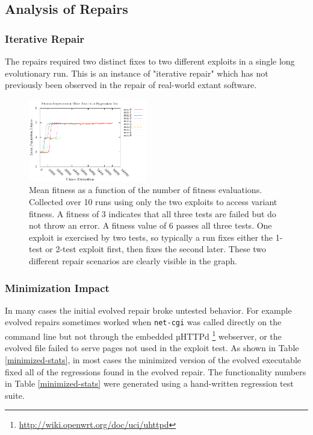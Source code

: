 \documentclass{sigcomm-alternate}
\begin{document}
\subsection{Analysis of Repairs}
\label{sec-4-2}

\subsubsection{Iterative Repair}
\label{sec-4-2-1}
The repairs required two distinct fixes to two different exploits in a
single long evolutionary run.  This is an instance of "iterative
repair" which has not previously been observed in the repair of
real-world extant software.

\begin{figure}[htb]
  \centering
  \includegraphics[bb=0 0 355 248,width=0.46\textwidth]{fitness-improvement.pdf}
  \caption{Mean fitness as a function of the number of fitness
    evaluations.  Collected over 10 runs using only the two exploits
    to access variant fitness.  A fitness of 3 indicates that all
    three tests are failed but do not throw an error.  A fitness value
    of 6 passes all three tests.  One exploit is exercised by two
    tests, so typically a run fixes either the 1-test or 2-test
    exploit first, then fixes the second later.  These two different
    repair scenarios are clearly visible in the graph.}
  \label{fit-by-time}
\end{figure}

\subsubsection{Minimization Impact}
\label{sec-4-2-2}
In many cases the initial evolved repair broke untested behavior.  For
example evolved repairs sometimes worked when \texttt{net-cgi} was
called directly on the command line but not through the embedded
µHTTPd \footnote{\url{http://wiki.openwrt.org/doc/uci/uhttpd}}
webserver, or the evolved file failed to serve pages not used in the
exploit test.  As shown in Table \ref{minimized-stats}, in most cases
the minimized version of the evolved executable fixed all of the
regressions found in the evolved repair.  The functionality numbers in
Table \ref{minimized-stats} were generated using a hand-written
regression test suite.
\end{document}
